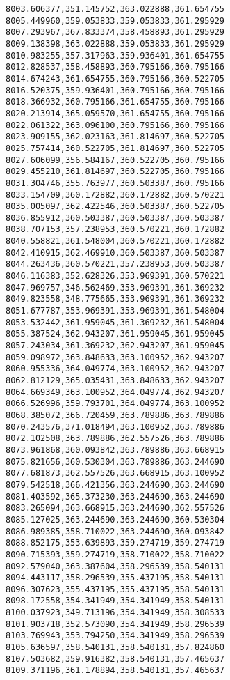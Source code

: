 \documentclass[11pt]{article}
\begin{document}
\begin{Verbatim}[commandchars=\\\{\}]
8003.606377,351.145752,363.022888,361.654755
8005.449960,359.053833,359.053833,361.295929
8007.293967,367.833374,358.458893,361.295929
8009.138398,363.022888,359.053833,361.295929
8010.983255,357.317963,359.936401,361.654755
8012.828537,358.458893,360.795166,360.795166
8014.674243,361.654755,360.795166,360.522705
8016.520375,359.936401,360.795166,360.795166
8018.366932,360.795166,361.654755,360.795166
8020.213914,365.059570,361.654755,360.795166
8022.061322,363.096100,360.795166,360.795166
8023.909155,362.023163,361.814697,360.522705
8025.757414,360.522705,361.814697,360.522705
8027.606099,356.584167,360.522705,360.795166
8029.455210,361.814697,360.522705,360.795166
8031.304746,355.763977,360.503387,360.795166
8033.154709,360.172882,360.172882,360.570221
8035.005097,362.422546,360.503387,360.522705
8036.855912,360.503387,360.503387,360.503387
8038.707153,357.238953,360.570221,360.172882
8040.558821,361.548004,360.570221,360.172882
8042.410915,362.469910,360.503387,360.503387
8044.263436,360.570221,357.238953,360.503387
8046.116383,352.628326,353.969391,360.570221
8047.969757,346.562469,353.969391,361.369232
8049.823558,348.775665,353.969391,361.369232
8051.677787,353.969391,353.969391,361.548004
8053.532442,361.959045,361.369232,361.548004
8055.387524,362.943207,361.959045,361.959045
8057.243034,361.369232,362.943207,361.959045
8059.098972,363.848633,363.100952,362.943207
8060.955336,364.049774,363.100952,362.943207
8062.812129,365.035431,363.848633,362.943207
8064.669349,363.100952,364.049774,362.943207
8066.526996,359.793701,364.049774,363.100952
8068.385072,366.720459,363.789886,363.789886
8070.243576,371.018494,363.100952,363.789886
8072.102508,363.789886,362.557526,363.789886
8073.961868,360.093842,363.789886,363.668915
8075.821656,360.530304,363.789886,363.244690
8077.681873,362.557526,363.668915,363.100952
8079.542518,366.421356,363.244690,363.244690
8081.403592,365.373230,363.244690,363.244690
8083.265094,363.668915,363.244690,362.557526
8085.127025,363.244690,363.244690,360.530304
8086.989385,358.710022,363.244690,360.093842
8088.852175,353.639893,359.274719,359.274719
8090.715393,359.274719,358.710022,358.710022
8092.579040,363.387604,358.296539,358.540131
8094.443117,358.296539,355.437195,358.540131
8096.307623,355.437195,355.437195,358.540131
8098.172558,354.341949,354.341949,358.540131
8100.037923,349.713196,354.341949,358.308533
8101.903718,352.573090,354.341949,358.296539
8103.769943,353.794250,354.341949,358.296539
8105.636597,358.540131,358.540131,357.824860
8107.503682,359.916382,358.540131,357.465637
8109.371196,361.178894,358.540131,357.465637

\end{Verbatim}
\end{document}
